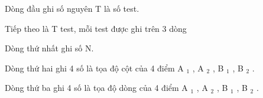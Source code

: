 Dòng đầu ghi số nguyên T là số test.

Tiếp theo là T test, mỗi test được ghi trên 3 dòng

Dòng thứ nhất ghi số N.

Dòng thứ hai ghi 4 số là tọa độ cột của 4 điểm A $_ 1 $ , A $_ 2 $ , B $_ 1 $ , B $_ 2 $ .

Dòng thứ ba ghi 4 số là tọa độ dòng của 4 điểm A $_ 1 $ , A $_ 2 $ , B $_ 1 $ , B $_ 2 $ .

\